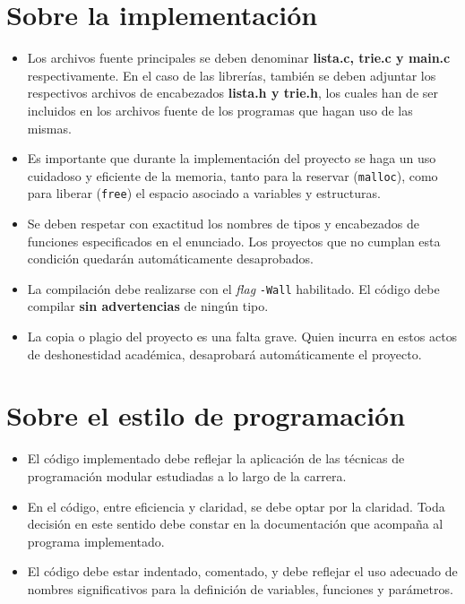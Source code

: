 \documentclass[12pt,a4paper]{article}
\begin{document}
\section*{Sobre la implementación}
\begin{itemize}
	\item Los archivos fuente principales se deben denominar \textbf{\textsf{lista.c}, \textsf{trie.c} y \textsf{main.c}}
	respectivamente. En el caso de las librerías, también se deben adjuntar los respectivos archivos de encabezados \textbf{\textsf{lista.h} y \textsf{trie.h}}, los cuales han de	ser incluidos en los archivos fuente de los programas que hagan uso de las mismas.
	
	\item Es importante que durante la implementación del proyecto se haga un uso
	cuidadoso y eficiente de la memoria, tanto para la reservar
	(\texttt{malloc}), como para liberar (\texttt{free}) el espacio asociado a
	variables y estructuras.
	
	\item Se deben respetar con exactitud los nombres de tipos y encabezados de
	funciones especificados en el enunciado. Los proyectos que no cumplan esta condición quedarán automáticamente desaprobados.
	
	\item La compilación debe realizarse con el \emph{flag} \texttt{-Wall} habilitado. El código debe compilar \textbf{sin advertencias} de ningún tipo.
	
	\item La copia o plagio del proyecto es una falta grave. Quien incurra en estos actos de deshonestidad académica, desaprobará automáticamente el proyecto.
\end{itemize}

\section*{Sobre el estilo de programación}
\begin{itemize}
		
	\item El código implementado debe reflejar la aplicación de las técnicas de programación modular estudiadas a lo largo de la carrera.
	
	\item En el código, entre eficiencia y claridad, se debe optar por la claridad. Toda decisión en este sentido debe constar en la documentación que acompaña al programa implementado.
	
	\item El código debe estar indentado, comentado, y debe reflejar el uso adecuado de nombres significativos para la definición de variables, funciones y parámetros.
	
\end{itemize}
\end{document}
